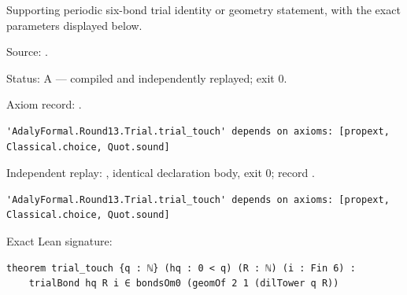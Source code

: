 \begin{theorem}[bp-364]
\label{bp-364}
\leanok
Supporting periodic six-bond trial identity or geometry statement, with the exact parameters displayed below.

\par Source: \texttt{}.
\par Status: A — compiled and independently replayed; exit 0.
\par Axiom record: \texttt{}.
\begin{verbatim}
'AdalyFormal.Round13.Trial.trial_touch' depends on axioms: [propext, Classical.choice, Quot.sound]
\end{verbatim}
\par Independent replay: \texttt{}, identical declaration body, exit 0; record \texttt{}.
\begin{verbatim}
'AdalyFormal.Round13.Trial.trial_touch' depends on axioms: [propext, Classical.choice, Quot.sound]
\end{verbatim}
\par Exact Lean signature:
\begin{verbatim}
theorem trial_touch {q : ℕ} (hq : 0 < q) (R : ℕ) (i : Fin 6) :
    trialBond hq R i ∈ bondsOm0 (geomOf 2 1 (dilTower q R))
\end{verbatim}
\end{theorem}

